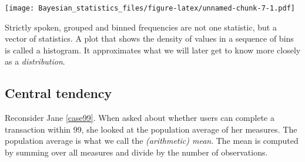 \documentclass[]{svmono}
\newenvironment{Shaded}{\begin{snugshade}}{\end{snugshade}}
\newcommand{\KeywordTok}[1]{\textcolor[rgb]{0.13,0.29,0.53}{\textbf{#1}}}
\newcommand{\DataTypeTok}[1]{\textcolor[rgb]{0.13,0.29,0.53}{#1}}
\newcommand{\DecValTok}[1]{\textcolor[rgb]{0.00,0.00,0.81}{#1}}
\newcommand{\StringTok}[1]{\textcolor[rgb]{0.31,0.60,0.02}{#1}}
\newcommand{\CommentTok}[1]{\textcolor[rgb]{0.56,0.35,0.01}{\textit{#1}}}
\newcommand{\ControlFlowTok}[1]{\textcolor[rgb]{0.13,0.29,0.53}{\textbf{#1}}}
\newcommand{\OperatorTok}[1]{\textcolor[rgb]{0.81,0.36,0.00}{\textbf{#1}}}
\newcommand{\NormalTok}[1]{#1}
\theoremstyle{definition}
\theoremstyle{definition}
\theoremstyle{definition}
\theoremstyle{remark}
\begin{document}
\begin{Shaded}
\end{Shaded}

\texttt{[image: Bayesian\_statistics\_files/figure-latex/unnamed-chunk-7-1.pdf]}

\begin{Shaded}
\end{Shaded}

Strictly spoken, grouped and binned frequencies are not one statistic,
but a vector of statistics. A plot that shows the density of values in a
sequence of bins is called a histogram. It approximates what we will
later get to know more closely as a \emph{distribution}.

\subsection{Central tendency}\label{central-tendency}

Reconsider Jane \ref{case99}. When asked about whether users can
complete a transaction within 99, she looked at the population average
of her measures. The population average is what we call the
\emph{(arithmetic) mean}. The mean is computed by summing over all
measures and divide by the number of observations.
\end{document}
